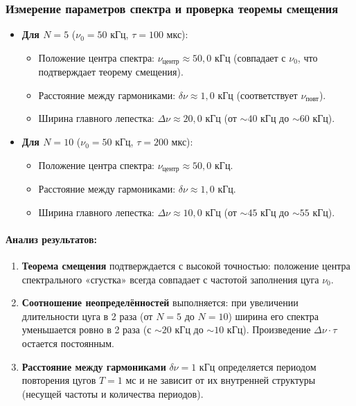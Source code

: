 \documentclass[a4paper,10pt]{article}
\begin{document}
\subsubsection*{ Измерение параметров спектра и проверка теоремы смещения}

\begin{itemize}
    \item \textbf{Для \(N=5\)} (\(\nu_0 = 50\) кГц, \(\tau = 100\) мкс):
    \begin{itemize}
        \item Положение центра спектра: \(\nu_{\text{центр}} \approx 50,0\) кГц (совпадает с \(\nu_0\), что подтверждает теорему смещения).
        \item Расстояние между гармониками: \(\delta\nu \approx 1,0\) кГц (соответствует \(\nu_{\text{повт}}\)).
        \item Ширина главного лепестка: \(\Delta\nu \approx 20,0\) кГц (от \(\sim 40\) кГц до \(\sim 60\) кГц).
    \end{itemize}
    \item \textbf{Для \(N=10\)} (\(\nu_0 = 50\) кГц, \(\tau = 200\) мкс):
    \begin{itemize}
        \item Положение центра спектра: \(\nu_{\text{центр}} \approx 50,0\) кГц.
        \item Расстояние между гармониками: \(\delta\nu \approx 1,0\) кГц.
        \item Ширина главного лепестка: \(\Delta\nu \approx 10,0\) кГц (от \(\sim 45\) кГц до \(\sim 55\) кГц).
    \end{itemize}
\end{itemize}

\paragraph{Анализ результатов:}
\begin{enumerate}
    \item \textbf{Теорема смещения} подтверждается с высокой точностью: положение центра спектрального «сгустка» всегда совпадает с частотой заполнения цуга \(\nu_0\).
    \item \textbf{Соотношение неопределённостей} выполняется: при увеличении длительности цуга в 2 раза (от \(N=5\) до \(N=10\)) ширина его спектра уменьшается ровно в 2 раза (с \(\sim 20\) кГц до \(\sim 10\) кГц). Произведение \(\Delta\nu \cdot \tau\) остается постоянным.
    \item \textbf{Расстояние между гармониками} \(\delta\nu = 1\) кГц определяется периодом повторения цугов \(T = 1\) мс и не зависит от их внутренней структуры (несущей частоты и количества периодов).
\end{enumerate}
\end{document}
